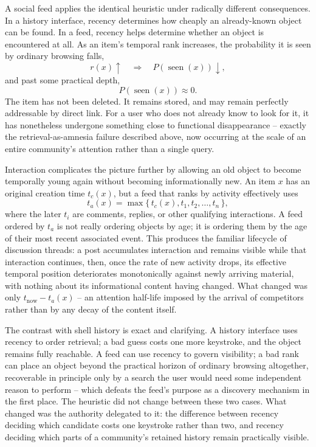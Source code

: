 \documentclass[11pt]{article}
\begin{document}
A social feed applies the identical heuristic under radically different consequences. In a history interface, recency determines how cheaply an already-known object can be found. In a feed, recency helps determine whether an object is encountered at all. As an item's temporal rank increases, the probability it is seen by ordinary browsing falls,
\[
r(x)\uparrow \quad\Longrightarrow\quad P(\operatorname{seen}(x))\downarrow,
\]
and past some practical depth,
\[
P(\operatorname{seen}(x)) \approx 0.
\]
The item has not been deleted. It remains stored, and may remain perfectly addressable by direct link. For a user who does not already know to look for it, it has nonetheless undergone something close to functional disappearance -- exactly the retrieval-as-amnesia failure described above, now occurring at the scale of an entire community's attention rather than a single query.

Interaction complicates the picture further by allowing an old object to become temporally young again without becoming informationally new. An item $x$ has an original creation time $t_c(x)$, but a feed that ranks by activity effectively uses
\[
t_a(x) = \max\{\,t_c(x), t_1, t_2, \ldots, t_n\,\},
\]
where the later $t_i$ are comments, replies, or other qualifying interactions. A feed ordered by $t_a$ is not really ordering objects by age; it is ordering them by the age of their most recent associated event. This produces the familiar lifecycle of discussion threads: a post accumulates interaction and remains visible while that interaction continues, then, once the rate of new activity drops, its effective temporal position deteriorates monotonically against newly arriving material, with nothing about its informational content having changed. What changed was only $t_{\text{now}} - t_a(x)$ -- an attention half-life imposed by the arrival of competitors rather than by any decay of the content itself.

The contrast with shell history is exact and clarifying. A history interface uses recency to order retrieval; a bad guess costs one more keystroke, and the object remains fully reachable. A feed can use recency to govern visibility; a bad rank can place an object beyond the practical horizon of ordinary browsing altogether, recoverable in principle only by a search the user would need some independent reason to perform -- which defeats the feed's purpose as a discovery mechanism in the first place. The heuristic did not change between these two cases. What changed was the authority delegated to it: the difference between recency deciding which candidate costs one keystroke rather than two, and recency deciding which parts of a community's retained history remain practically visible.
\end{document}
